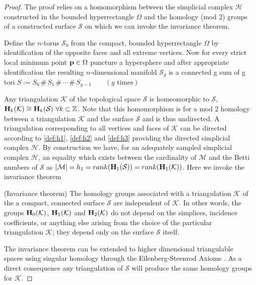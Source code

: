 \begin{proof}
The proof relies on a homomorphism between the simplicial complex $\mathcal{H}$ constructed in the bounded hyperrectangle $\Omega$ and the homology (mod 2) groups of a constructed surface $\mathcal{S}$ on which we can invoke the invariance theorem.

Define the $n$-torus $\mathcal{S}_0$ from the compact, bounded hyperrectangle $\Omega$ by identification of the opposite faces and all extreme vertices. Now for every strict local minimum point $\bold{p} \in \Omega$ puncture a hypersphere and after appropriate identification the resulting $n$-dimensional manifold $\mathcal{S}_g$ is a connected g sum of g tori $S := S_0\,\#\,S_1\,\#\,\cdots\,\#\,S_{g - 1} \qquad  (g\text{ times})$

Any triangulation $\mathcal{K}$ of the topological space $\mathcal{S}$ is homeomorphic to $\mathcal{S}$, $\bold{H}_k(\mathcal{K}) \cong \bold{H}_k(\mathcal{S}) ~\forall k \subset \mathbb{Z}$. Note that this homomorphism is for a mod 2 homology between a triangulation $\mathcal{K}$ and the surface $\mathcal{S}$ and is thus undirected. A triangulation corresponding to all vertices and faces of $\mathcal{K}$ can be directed according to \autoref{def:h1}, \autoref{def:h2} and \autoref{def:h3} providing the directed simplicial complex $\mathcal{H}$. By construction we have, for an adequately sampled simplicial complex $\mathcal{H}$, an equality which exists between the cardinality of $\mathcal{M}$ and the Betti numbers of $\mathcal{S}$ as $|\mathcal{M}| = h_1 = rank (\bold{H}_1(\mathcal{S})) = rank (\bold{H}_1(\mathcal{K}))$. Here we invoke the invariance theorem

\begin{theorem} (Invariance theorem\cite{Henle1979}) %
The homology groups associated with a triangulation $\mathcal{K}$ of the a compact, connected surface $\mathcal{S}$ are independent of $\mathcal{K}$. In other words, the groups $\bold{H}_0 (\mathcal{K})$, $\bold{H}_1 (\mathcal{K})$ and $\bold{H}_2 (\mathcal{K})$ do not depend on the simplices, incidence coefficients, or anything else arising from the choice of the particular triangulation $\mathcal{K}$; they depend only on the surface $\mathcal{S}$ itself.
\end{theorem}
The invariance theorem can be extended to higher dimensional triangulable spaces using singular homology through the Eilenberg-Steenrod Axioms \cite{eilenberg47foundations, Henle1979}. As a direct consequence any triangulation of $\mathcal{S}$ will produce the same homology groups for $\mathcal{K}$.


\end{proof}
